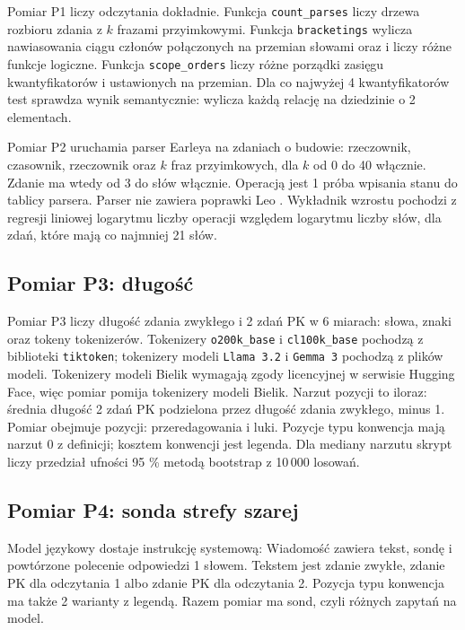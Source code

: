 Pomiar P1 liczy odczytania dokładnie. Funkcja \texttt{count\_parses} liczy drzewa rozbioru
zdania z $k$ frazami przyimkowymi. Funkcja \texttt{bracketings} wylicza nawiasowania ciągu
członów połączonych na przemian słowami  oraz  i liczy różne funkcje
logiczne. Funkcja \texttt{scope\_orders} liczy różne porządki zasięgu kwantyfikatorów
 i  ustawionych na przemian. Dla co najwyżej 4 kwantyfikatorów test
sprawdza wynik semantycznie: wylicza każdą relację na dziedzinie o 2 elementach.

Pomiar P2 uruchamia parser Earleya na zdaniach o budowie: rzeczownik, czasownik,
rzeczownik oraz $k$ fraz przyimkowych, dla $k$ od 0 do 40 włącznie. Zdanie ma wtedy
od 3 do \pkParseWordsMax{} słów włącznie. Operacją jest 1 próba wpisania stanu do tablicy
parsera. Parser nie zawiera poprawki Leo \cite{leo1991}. Wykładnik wzrostu pochodzi
z regresji liniowej logarytmu liczby operacji względem logarytmu liczby słów, dla zdań,
które mają co najmniej 21 słów.

\subsection{Pomiar P3: długość}

Pomiar P3 liczy długość zdania zwykłego i 2 zdań PK w 6 miarach: słowa, znaki oraz tokeny
\pkTokTokenizers{} tokenizerów. Tokenizery \texttt{o200k\_base} i \texttt{cl100k\_base}
pochodzą z biblioteki \texttt{tiktoken}; tokenizery modeli \texttt{Llama 3.2} i \texttt{Gemma 3} pochodzą
z plików modeli. Tokenizery modeli Bielik wymagają zgody licencyjnej w serwisie
Hugging Face, więc pomiar pomija tokenizery modeli Bielik. Narzut pozycji to iloraz: średnia długość
2 zdań PK podzielona przez długość zdania zwykłego, minus 1. Pomiar obejmuje \pkTokItems{} pozycji:
przeredagowania i luki. Pozycje typu konwencja mają narzut 0 z definicji; kosztem
konwencji jest legenda. Dla mediany narzutu skrypt liczy przedział ufności 95 \% metodą
bootstrap z 10\,000 losowań.

\subsection{Pomiar P4: sonda strefy szarej}
\label{sec:probemethod}

Model językowy dostaje instrukcję systemową:  Wiadomość zawiera tekst, sondę i powtórzone
polecenie odpowiedzi 1 słowem. Tekstem jest zdanie zwykłe, zdanie PK dla odczytania 1 albo
zdanie PK dla odczytania 2. Pozycja typu konwencja ma także 2 warianty z legendą. Razem
pomiar ma \pkProbes{} sond, czyli \pkProbesUnique{} różnych zapytań na model.

